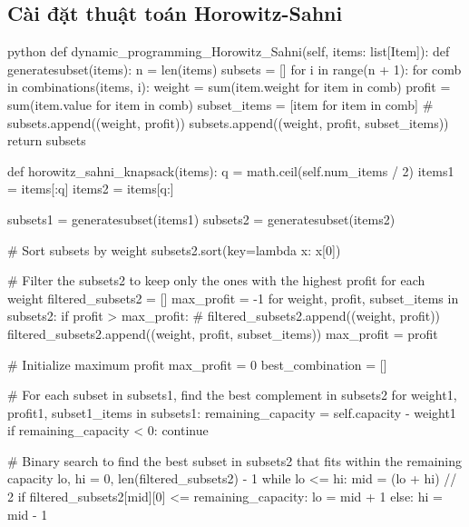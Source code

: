 \subsection{Cài đặt thuật toán Horowitz-Sahni}


\begin{mintedbox}{python}
    def dynamic_programming_Horowitz_Sahni(self, items: list[Item]):
        def generatesubset(items):
            n = len(items)
            subsets = []
            for i in range(n + 1):
                for comb in combinations(items, i):
                    weight = sum(item.weight for item in comb)
                    profit = sum(item.value for item in comb)
                    subset_items = [item for item in comb]
                    # subsets.append((weight, profit))
                    subsets.append((weight, profit, subset_items))
            return subsets

        def horowitz_sahni_knapsack(items):
            q = math.ceil(self.num_items / 2)
            items1 = items[:q]
            items2 = items[q:]

            subsets1 = generatesubset(items1)
            subsets2 = generatesubset(items2)

            # Sort subsets by weight
            subsets2.sort(key=lambda x: x[0])

            # Filter the subsets2 to keep only the ones with the highest profit for each weight
            filtered_subsets2 = []
            max_profit = -1
            for weight, profit, subset_items in subsets2:
                if profit > max_profit:
                    # filtered_subsets2.append((weight, profit))
                    filtered_subsets2.append((weight, profit, subset_items))
                    max_profit = profit

            # Initialize maximum profit
            max_profit = 0
            best_combination = []

            # For each subset in subsets1, find the best complement in subsets2
            for weight1, profit1, subset1_items in subsets1:
                remaining_capacity = self.capacity - weight1
                if remaining_capacity < 0:
                    continue

                # Binary search to find the best subset in subsets2 that fits within the remaining capacity
                lo, hi = 0, len(filtered_subsets2) - 1
                while lo <= hi:
                    mid = (lo + hi) // 2
                    if filtered_subsets2[mid][0] <= remaining_capacity:
                        lo = mid + 1
                    else:
                        hi = mid - 1


\end{mintedbox}
